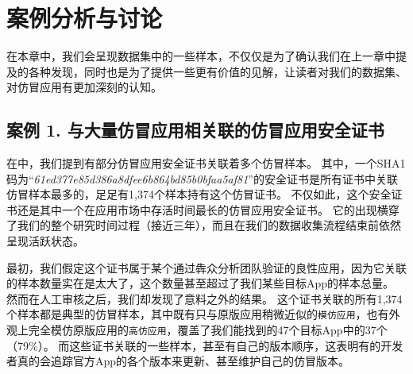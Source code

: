 \chapter{案例分析与讨论}
\label{chp:casestudy}
在本章中，我们会呈现数据集中的一些样本，不仅仅是为了确认我们在上一章中提及的各种发现，同时也是为了提供一些更有价值的见解，让读者对我们的数据集、对仿冒应用有更加深刻的认知。

\section{案例 1. 与大量仿冒应用相关联的仿冒应用安全证书}
\label{sec:case1}

在中，我们提到有部分仿冒应用安全证书关联着多个仿冒样本。
其中，一个SHA1码为``\emph{61ed377e85d386a8dfee6b864bd85b0bfaa5af81}''的安全证书是所有证书中关联仿冒样本最多的，足足有1,374个样本持有这个仿冒证书。
不仅如此，这个安全证书还是其中一个在应用市场中存活时间最长的仿冒应用安全证书。
它的出现横穿了我们的整个研究时间过程（接近三年），而且在我们的数据收集流程结束前依然呈现活跃状态。

最初，我们假定这个证书属于某个通过犇众分析团队验证的良性应用，因为它关联的样本数量实在是太大了，这个数量甚至超过了我们某些目标App的样本总量。
然而在人工审核之后，我们却发现了意料之外的结果。
这个证书关联的所有1,374个样本都是典型的仿冒样本，其中既有只与原版应用稍微近似的\texttt{模仿应用}，也有外观上完全模仿原版应用的\texttt{高仿应用}，覆盖了我们能找到的47个目标App中的37个（79\%）。
而这些证书关联的一些样本，甚至有自己的版本顺序，这表明有的开发者真的会追踪官方App的各个版本来更新、甚至维护自己的仿冒版本。


